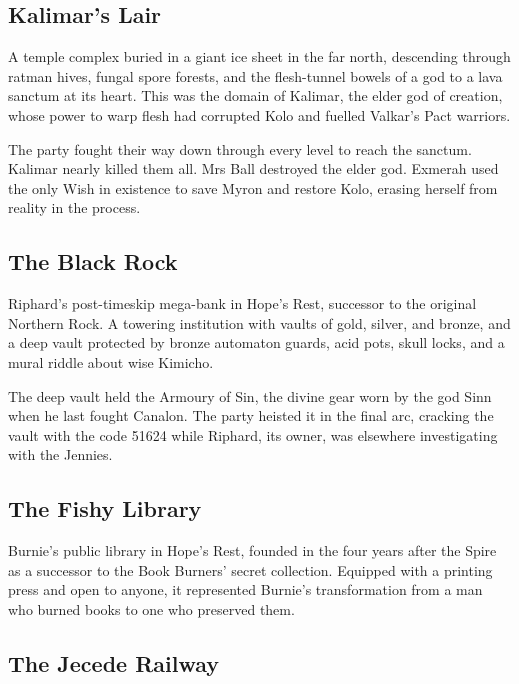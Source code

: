 \subsection*{Kalimar's Lair}

A temple complex buried in a giant ice sheet in the far north, descending through ratman hives, fungal spore forests, and the flesh-tunnel bowels of a god to a lava sanctum at its heart.  This was the domain of Kalimar, the elder god of creation, whose power to warp flesh had corrupted Kolo and fuelled Valkar's Pact warriors.

The party fought their way down through every level to reach the sanctum.  Kalimar nearly killed them all.  Mrs Ball destroyed the elder god.  Exmerah used the only Wish in existence to save Myron and restore Kolo, erasing herself from reality in the process.

\smallskip

\subsection*{The Black Rock}

Riphard's post-timeskip mega-bank in Hope's Rest, successor to the original Northern Rock.  A towering institution with vaults of gold, silver, and bronze, and a deep vault protected by bronze automaton guards, acid pots, skull locks, and a mural riddle about wise Kimicho.

The deep vault held the Armoury of Sin, the divine gear worn by the god Sinn when he last fought Canalon.  The party heisted it in the final arc, cracking the vault with the code 51624 while Riphard, its owner, was elsewhere investigating with the Jennies.

\smallskip

\subsection*{The Fishy Library}

Burnie's public library in Hope's Rest, founded in the four years after the Spire as a successor to the Book Burners' secret collection.  Equipped with a printing press and open to anyone, it represented Burnie's transformation from a man who burned books to one who preserved them.

\smallskip

\subsection*{The Jecede Railway}

